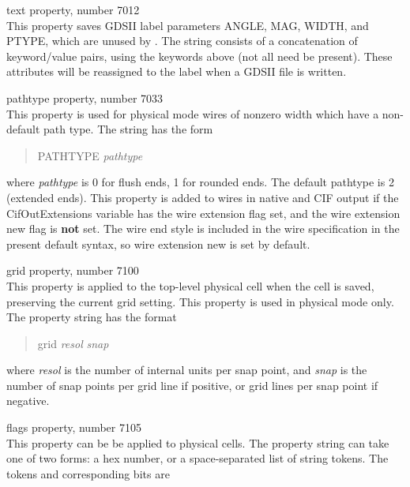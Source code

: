 \begin{description}
\item{\et text} property, number 7012\\
This property saves GDSII label parameters ANGLE, MAG, WIDTH, and
PTYPE, which are unused by {\Xic}.  The string consists of a
concatenation of keyword/value pairs, using the keywords above
(not all need be present).  These attributes will be reassigned to
the label when a GDSII file is written.

\item{\et pathtype} property, number 7033\\
This property is used for physical mode wires of nonzero width
which have a non-default path type.  The string has the form
\begin{quote}
{\vt PATHTYPE} {\it pathtype}
\end{quote}
where {\it pathtype} is 0 for flush ends, 1 for rounded ends.  The
default pathtype is 2 (extended ends).
This property is added to wires in native and CIF output if the {\et
CifOutExtensions} variable has the {\cb wire extension} flag set, and
the {\cb wire extension new} flag is {\bf not} set.  The wire end
style is included in the wire specification in the present default
syntax, so {\cb wire extension new} is set by default. 

\item{\et grid} property, number 7100\\
This property is applied to the top-level physical cell when the cell
is saved, preserving the current grid setting.  This property is used
in physical mode only.  The property string has the format
\begin{quote}
{\vt grid} {\it resol} {\it snap}
\end{quote}
where {\it resol} is the number of internal units per snap point, and
{\it snap} is the number of snap points per grid line if positive, or
grid lines per snap point if negative.

\item{\et flags} property, number 7105\\
This property can be be applied to physical cells.  The property
string can take one of two forms:  a hex number, or a space-separated
list of string tokens.  The tokens and corresponding bits are


\end{description}
